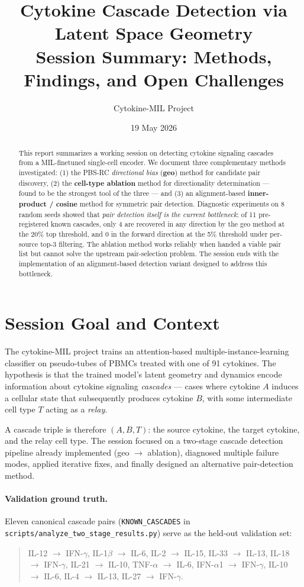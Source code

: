 \documentclass[11pt,a4paper]{article}
\title{\Large\bfseries Cytokine Cascade Detection via Latent Space Geometry \\[0.3em]
\large Session Summary: Methods, Findings, and Open Challenges}
\author{Cytokine-MIL Project}
\date{19 May 2026}
\newcommand{\codeword}[1]{\texttt{\small #1}}
\begin{document}
\maketitle

\begin{abstract}
\noindent
This report summarizes a working session on detecting cytokine signaling cascades
from a MIL-finetuned single-cell encoder. We document three complementary methods
investigated: (1) the PBS-RC \emph{directional bias} (\textbf{geo}) method for
candidate pair discovery, (2) the \textbf{cell-type ablation} method for
directionality determination --- found to be the strongest tool of the three ---
and (3) an alignment-based \textbf{inner-product / cosine} method for symmetric
pair detection. Diagnostic experiments on 8 random seeds showed that
\emph{pair detection itself is the current bottleneck}: of 11 pre-registered known
cascades, only 4 are recovered in any direction by the geo method at the 20\% top
threshold, and 0 in the forward direction at the 5\% threshold under per-source
top-3 filtering. The ablation method works reliably when handed a viable pair
list but cannot solve the upstream pair-selection problem. The session ends with
the implementation of an alignment-based detection variant designed to address
this bottleneck.
\end{abstract}

\section{Session Goal and Context}

The cytokine-MIL project trains an attention-based multiple-instance-learning
classifier on pseudo-tubes of PBMCs treated with one of 91 cytokines. The
hypothesis is that the trained model's latent geometry and dynamics encode
information about cytokine signaling \emph{cascades} --- cases where cytokine
$A$ induces a cellular state that subsequently produces cytokine $B$, with
some intermediate cell type $T$ acting as a \emph{relay}.

A cascade triple is therefore $(A, B, T)$: the source cytokine, the target
cytokine, and the relay cell type. The session focused on a two-stage cascade
detection pipeline already implemented (geo $\to$ ablation), diagnosed
multiple failure modes, applied iterative fixes, and finally designed an
alternative pair-detection method.

\paragraph{Validation ground truth.}
Eleven canonical cascade pairs (\codeword{KNOWN\_CASCADES} in
\codeword{scripts/analyze\_two\_stage\_results.py}) serve as the held-out
validation set:
\begin{quote}\small
IL-12 $\to$ IFN-$\gamma$, IL-1$\beta$ $\to$ IL-6, IL-2 $\to$ IL-15,
IL-33 $\to$ IL-13, IL-18 $\to$ IFN-$\gamma$, IL-21 $\to$ IL-10,
TNF-$\alpha$ $\to$ IL-6, IFN-$\alpha$1 $\to$ IFN-$\gamma$, IL-10 $\to$ IL-6,
IL-4 $\to$ IL-13, IL-27 $\to$ IFN-$\gamma$.
\end{quote}
\end{document}

